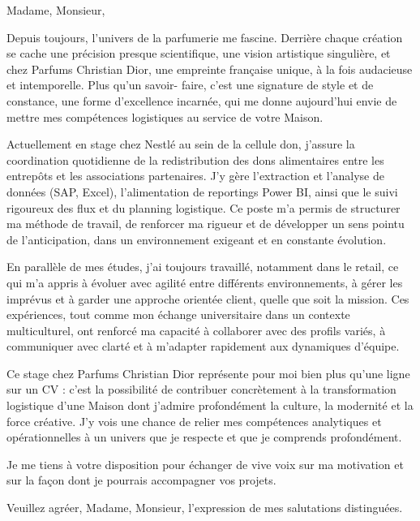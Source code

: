 
Madame, Monsieur,

Depuis toujours, l’univers de la parfumerie me fascine. Derrière chaque création se cache une
précision presque scientifique, une vision artistique singulière, et chez Parfums Christian
Dior, une empreinte française unique, à la fois audacieuse et intemporelle. Plus qu’un savoir-
faire, c’est une signature de style et de constance, une forme d’excellence incarnée, qui me
donne aujourd’hui envie de mettre mes compétences logistiques au service de votre Maison.

Actuellement en stage chez Nestlé au sein de la cellule don, j’assure la coordination
quotidienne de la redistribution des dons alimentaires entre les entrepôts et les associations
partenaires. J’y gère l’extraction et l’analyse de données (SAP, Excel), l’alimentation de
reportings Power BI, ainsi que le suivi rigoureux des flux et du planning logistique. Ce poste
m’a permis de structurer ma méthode de travail, de renforcer ma rigueur et de développer un
sens pointu de l’anticipation, dans un environnement exigeant et en constante évolution.

En parallèle de mes études, j’ai toujours travaillé, notamment dans le retail, ce qui m’a appris
à évoluer avec agilité entre différents environnements, à gérer les imprévus et à garder une
approche orientée client, quelle que soit la mission. Ces expériences, tout comme mon
échange universitaire dans un contexte multiculturel, ont renforcé ma capacité à collaborer
avec des profils variés, à communiquer avec clarté et à m’adapter rapidement aux dynamiques
d’équipe.

Ce stage chez Parfums Christian Dior représente pour moi bien plus qu’une ligne sur un CV :
c’est la possibilité de contribuer concrètement à la transformation logistique d’une Maison
dont j’admire profondément la culture, la modernité et la force créative. J’y vois une chance
de relier mes compétences analytiques et opérationnelles à un univers que je respecte et que je
comprends profondément.

Je me tiens à votre disposition pour échanger de vive voix sur ma motivation et sur la façon
dont je pourrais accompagner vos projets.

Veuillez agréer, Madame, Monsieur, l’expression de mes salutations distinguées.

